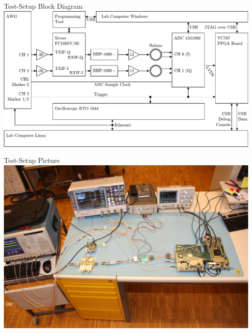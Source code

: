 \documentclass{beamer}
\begin{document}
\begin{frame}{Test-Setup Block Diagram}
  \includegraphics[width=\textwidth]{figures/res_450_setup}
\end{frame}

\begin{frame}{Test-Setup Picture}
  \includegraphics[width=\textwidth]{pictures/res_450_setup}
\end{frame}
\end{document}
